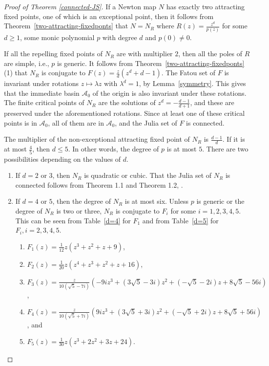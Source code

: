 \documentclass[12pt]{article}
\numberwithin{equation}{section}
\begin{document}
\begin{proof}[Proof of Theorem \ref{connected-JS}]
If a Newton map $N$ has exactly two attracting fixed points, one of which is an exceptional point, then it follows from Theorem~\ref{two-attracting-fixedponts} that $N=N_R$ where $R(z)=\frac{z^d}{p(z)}$ for some $d \geq 1$, some monic polynomial $p$ with degree $d$ and $p(0) \neq 0$. 
\par If all the repelling fixed points of $N_R$ are with multiplier $2$, then all the poles of $R$ are simple, i.e., $p$ is generic. It follows from Theorem~\ref{two-attracting-fixedponts}(1) that $N_R$ is conjugate to  $F(z)=\frac{z}{d}(z^d+d-1)$. The Fatou set of $F$ is invariant under rotations $z \mapsto \lambda z$ with $\lambda^d =1$, by Lemma~\ref{symmetry}. This gives that the immediate basin $\mathcal{A}_0$ of the origin is also invariant under these rotations. The finite critical points of $N_R$ are the solutions of $z^d=-\frac{d-1}{d+1}$, and these are preserved under the aforementioned rotations. Since at least one of these critical points is in $\mathcal{A}_0$, all of them are in $\mathcal{A}_0$, and the Julia set of $F$ is connected. 

\par The multiplier of the non-exceptional attracting fixed point of $N_R$ is $\frac{d-1}{d}$.  If it is at most $\frac{4}{5}$, then $d \leq 5$. In other words, the degree of $p$ is at most $5$. 
There are two possibilities depending on the values of $d$.
\begin{enumerate}
 	\item If $d=2$ or $3$, then $N_R$ is quadratic or cubic. That the Julia set of $N_R$ is connected follows from Theorem 1.1 and Theorem 1.2, \cite{Nayak_Pal2022}.
	\item  If $d=4$ or $5$, then the degree of $N_R$ is at most six. Unless $p$ is generic or the degree of $N_R$ is two or three, $N_R$ is conjugate to $F_i$ for some $ i =1,2,3,4,5$. This can be seen from Table~\ref{d=4} for $F_1$ and from Table~\ref{d=5} for $F_i, i=2,3,4,5$.
	{\begin{enumerate}
		\item  $F_1(z) = \frac{1}{12}z(z^3+z^2+z+9)$,
		\item $ F_2 (z)=\frac{1}{20}z(z^4+z^3+z^2+z+16)$,
		\item $ F_3 (z)=\frac{z}{10(\sqrt{5}- 7i)}(-9 i z^3+(3 \sqrt{5}-3i)z^2 +(-\sqrt{5}- 2i)z+ 8\sqrt{5}- 56i)$,
	 	\item $	F_4 (z)=\frac{z}{10(\sqrt{5}+ 7i)}(9 i z^3+(3 \sqrt{5}+ 3 i)z^2 +(-\sqrt{5}+ 2i)z+8\sqrt{5}+56 i) $, and
		\item $F_5 (z)= \frac{1}{30}z(z^3+2z^2+3z+24)$.
	\end{enumerate} }


\end{enumerate}
\end{proof}
\end{document}

